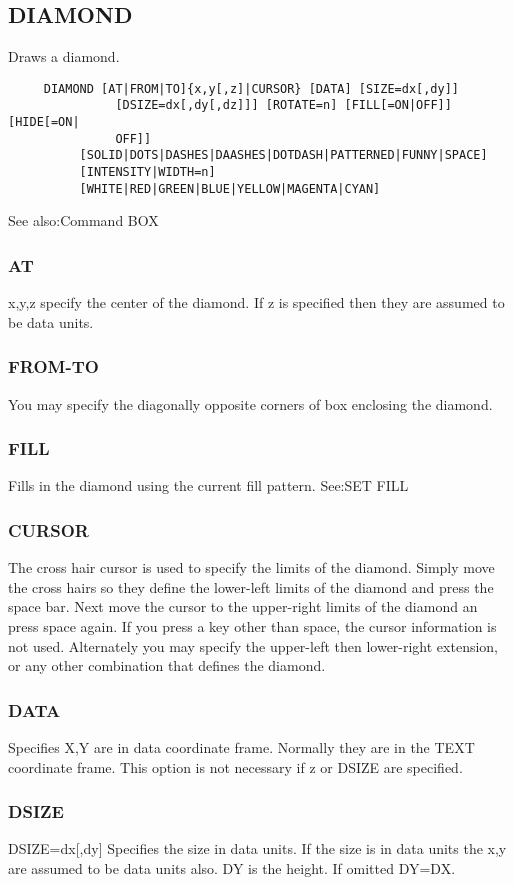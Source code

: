 \subsection{DIAMOND}
Draws a diamond.  

\begin{verbatim}
     DIAMOND [AT|FROM|TO]{x,y[,z]|CURSOR} [DATA] [SIZE=dx[,dy]]
               [DSIZE=dx[,dy[,dz]]] [ROTATE=n] [FILL[=ON|OFF]] [HIDE[=ON|
               OFF]] 
          [SOLID|DOTS|DASHES|DAASHES|DOTDASH|PATTERNED|FUNNY|SPACE] 
          [INTENSITY|WIDTH=n] 
          [WHITE|RED|GREEN|BLUE|YELLOW|MAGENTA|CYAN] 
\end{verbatim}
See also:Command BOX 
\subsubsection{AT}
x,y,z  specify  the center of the diamond.  If z is specified then they
are assumed to be data units.  
\subsubsection{FROM-TO}
You  may  specify  the diagonally opposite corners of box enclosing the
diamond.  
\subsubsection{FILL}
Fills in the diamond using the current fill pattern.  See:SET FILL 
\subsubsection{CURSOR}
The  cross  hair  cursor  is used to specify the limits of the diamond.
Simply move the cross hairs so they define the lower-left limits of the
diamond  and  press  the  space  bar.   Next  move  the  cursor  to the
upper-right limits of the diamond an press space again.  If you press a
key  other than space, the cursor information is not used.  Alternately
you may specify the upper-left then lower-right extension, or any other
combination that defines the diamond.  
\subsubsection{DATA}
Specifies  X,Y  are in data coordinate frame.  Normally they are in the
TEXT coordinate frame.  This option is not necessary if z or DSIZE  are
specified.  
\subsubsection{DSIZE}
DSIZE=dx[,dy] Specifies the size in data units.  If the size is in data
units the x,y are assumed to be data units also.  DY is the height.  If
omitted DY=DX.  
